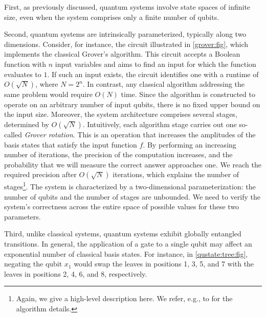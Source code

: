 First, as previously discussed, quantum systems involve state spaces of infinite size, even when the system comprises only a finite number of qubits.
%

Second, quantum systems are intrinsically parameterized, typically along two dimensions.
%
Consider, for instance, the circuit illustrated in \cref{grover:fig}, which implements the classical Grover’s algorithm.
%
This circuit accepts a Boolean function with $n$ input variables and aims to find an input for which the function evaluates to $1$.
%
If such an input exists, the circuit identifies one with a runtime of $O(\sqrt{N})$, where $N = 2^n$.
%
In contrast, any classical algorithm addressing the same problem would require $O(N)$ time.
%
Since the algorithm is constructed to operate on an arbitrary number of input qubits, there is no fixed upper bound on the input size.
%
Moreover, the system architecture comprises several stages, determined by $O(\sqrt{N})$.
%
Intuitively, each algorithm stage carries out one so-called {\it Grover rotation}.
%
This is an operation that increases the amplitudes of the basis states that satisfy the input function $f$.
%
By performing an increasing number of iterations, the precision of the computation increases, and the probability that we will measure the correct answer approaches one.
%
We reach the required precision after $O(\sqrt{N})$ iterations, which explains the number of stages\footnote{Again, we give a high-level description here. We refer, e.g., to \citep{10.5555/1408782} for the algorithm details.}.
%
The system is characterized by a two-dimensional parameterization: the number of qubits and the number of stages are unbounded.
%
We need to verify the system’s correctness across the entire space of possible values for these two parameters.
%

Third, unlike classical systems, quantum systems exhibit globally entangled transitions.
%
In general, the application of a gate to a single qubit may affect an exponential number of classical basis states. 
%
For instance, in \cref{qustate:tree:fig}, negating the qubit $x_1$ would swap the leaves in positions 1, 3, 5, and 7 with the leaves in positions 2, 4, 6, and 8, respectively.
%

